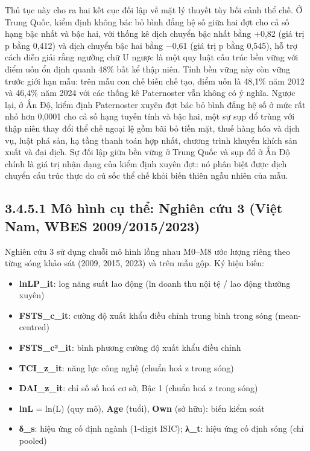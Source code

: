 \documentclass[
  a4paper,
  13pt]{extreport}
\providecommand{\tightlist}{%
  \setlength{\itemsep}{0pt}\setlength{\parskip}{0pt}}
\begin{document}
Thủ tục này cho ra hai kết cục đối lập về mặt lý thuyết tùy bối cảnh thể
chế. Ở Trung Quốc, kiểm định không bác bỏ bình đẳng hệ số giữa hai đợt
cho cả số hạng bậc nhất và bậc hai, với thống kê dịch chuyển bậc nhất
bằng +0,82 (giá trị p bằng 0,412) và dịch chuyển bậc hai bằng −0,61 (giá
trị p bằng 0,545), hỗ trợ cách diễn giải rằng ngưỡng chữ U ngược là một
quy luật cấu trúc bền vững với điểm uốn ổn định quanh 48\% bất kể thập
niên. Tính bền vững này còn vững trước giới hạn mẫu: trên mẫu con chế
biến chế tạo, điểm uốn là 48,1\% năm 2012 và 46,4\% năm 2024 với các
thống kê Paternoster vẫn không có ý nghĩa. Ngược lại, ở Ấn Độ, kiểm định
Paternoster xuyên đợt bác bỏ bình đẳng hệ số ở mức rất nhỏ hơn 0,0001
cho cả số hạng tuyến tính và bậc hai, một sự sụp đổ trùng với thập niên
thay đổi thể chế ngoại lệ gồm bãi bỏ tiền mặt, thuế hàng hóa và dịch vụ,
luật phá sản, hạ tầng thanh toán hợp nhất, chương trình khuyến khích sản
xuất và đại dịch. Sự đối lập giữa bền vững ở Trung Quốc và sụp đổ ở Ấn
Độ chính là giá trị nhận dạng của kiểm định xuyên đợt: nó phân biệt được
dịch chuyển cấu trúc thực do cú sốc thể chế khỏi biến thiên ngẫu nhiên
của mẫu.

\hypertarget{muxf4-huxecnh-cux1ee5-thux1ec3-nghiuxean-cux1ee9u-3-viux1ec7t-nam-wbes-200920152023}{%
\subsection{3.4.5.1 Mô hình cụ thể: Nghiên cứu 3 (Việt Nam, WBES
2009/2015/2023)}\label{muxf4-huxecnh-cux1ee5-thux1ec3-nghiuxean-cux1ee9u-3-viux1ec7t-nam-wbes-200920152023}}

Nghiên cứu 3 sử dụng chuỗi mô hình lồng nhau M0--M8 ước lượng riêng theo
từng sóng khảo sát (2009, 2015, 2023) và trên mẫu gộp. Ký hiệu biến:

\begin{itemize}
\tightlist
\item
  \textbf{lnLP\_it}: log năng suất lao động (ln doanh thu nội tệ / lao
  động thường xuyên)
\item
  \textbf{FSTS\_c\_it}: cường độ xuất khẩu điều chỉnh trung bình trong
  sóng (mean-centred)
\item
  \textbf{FSTS\_c²\_it}: bình phương cường độ xuất khẩu điều chỉnh
\item
  \textbf{TCI\_z\_it}: năng lực công nghệ (chuẩn hoá z trong sóng)
\item
  \textbf{DAI\_z\_it}: chỉ số số hoá cơ sở, Bậc 1 (chuẩn hoá z trong
  sóng)
\item
  \textbf{lnL} = ln(L) (quy mô), \textbf{Age} (tuổi), \textbf{Own} (sở
  hữu): biến kiểm soát
\item
  \textbf{δ\_s}: hiệu ứng cố định ngành (1-digit ISIC); \textbf{λ\_t}:
  hiệu ứng cố định sóng (chỉ pooled)
\end{itemize}
\end{document}
